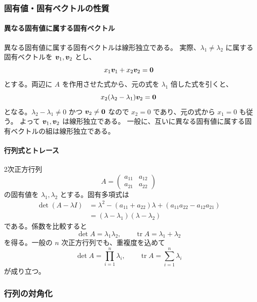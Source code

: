 \subsubsection{固有値・固有ベクトルの性質}

\paragraph{異なる固有値に属する固有ベクトル}
異なる固有値に属する固有ベクトルは線形独立である。
実際、$\lambda_1\ne\lambda_2$ に属する固有ベクトルを
$\bm{v}_1,\bm{v}_2$ とし、
\[
 x_1\bm{v}_1+x_2\bm{v}_2=\bm{0}
\]
とする。両辺に $A$ を作用させた式から、元の式を
$\lambda_1$ 倍した式を引くと、
\[
 x_2(\lambda_2-\lambda_1)\bm{v}_2=\bm{0}
\]
となる。$\lambda_2-\lambda_1\ne0$ かつ $\bm{v}_2\ne\bm{0}$
なので $x_2=0$ であり、元の式から $x_1=0$ も従う。
よって $\bm{v}_1,\bm{v}_2$ は線形独立である。
一般に、互いに異なる固有値に属する固有ベクトルの組は線形独立である。

\paragraph{行列式とトレース}
2次正方行列
\[
 A=\begin{pmatrix}a_{11}&a_{12}\\a_{21}&a_{22}\end{pmatrix}
\]
の固有値を $\lambda_1,\lambda_2$ とする。固有多項式は
\begin{align*}
 \det(A-\lambda I)
 &=\lambda^2-(a_{11}+a_{22})\lambda
   +(a_{11}a_{22}-a_{12}a_{21})\\
 &=(\lambda-\lambda_1)(\lambda-\lambda_2)
\end{align*}
である。係数を比較すると
\begin{equation}
 \boxed{\det A=\lambda_1\lambda_2,\qquad
        \operatorname{tr}A=\lambda_1+\lambda_2}
\end{equation}
を得る。一般の $n$ 次正方行列でも、重複度を込めて
\[
 \det A=\prod_{i=1}^n\lambda_i,\qquad
 \operatorname{tr}A=\sum_{i=1}^n\lambda_i
\]
が成り立つ。

\subsubsection{行列の対角化}

